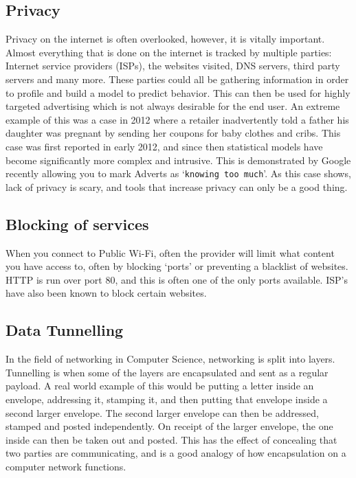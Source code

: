 \subsection{Privacy}
Privacy on the internet is often overlooked, however, it is vitally important\cite{privacyrulez}. Almost everything that is done on the internet is tracked by multiple parties: Internet service providers (ISPs), the websites visited, DNS servers, third party servers and many more. These parties could all be gathering information in order to profile and build a model to predict behavior. This can then be used for highly targeted advertising which is not always desirable for the end user. An extreme example of this was a case in 2012 where a retailer inadvertently told a father his daughter was pregnant by sending her coupons for baby clothes and cribs.\cite{babyshower}
This case was first reported in early 2012, and since then statistical models have become significantly more complex and intrusive. This is demonstrated by Google recently allowing you to mark Adverts as `\texttt{knowing too much}'\cite{googlearewatching}.
As this case shows, lack of privacy is scary, and tools that increase privacy can only be a good thing. 

\subsection{Blocking of services}
When you connect to Public Wi-Fi, often the provider will limit what content you have access to, often by blocking `ports' or preventing a blacklist of websites.\\
HTTP is run over port 80, and this is often one of the only ports available. ISP's have also been known to block certain websites.

\subsection{Data Tunnelling}
In the field of networking in Computer Science, networking is split into layers.
Tunnelling is when some of the layers are encapsulated and sent as a regular payload.
A real world example of this would be putting a letter inside an envelope, addressing it, stamping it, and then putting that envelope inside a second larger envelope. The second larger envelope can then be addressed, stamped and posted independently.
On receipt of the larger envelope, the one inside can then be taken out and posted. This has the effect of concealing that two parties are communicating, and is a good analogy of how encapsulation on a computer network functions.

